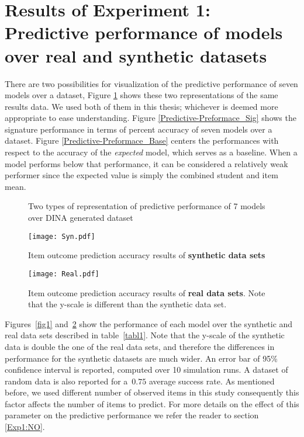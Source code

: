 \section{Results of Experiment 1: Predictive performance of models over real and synthetic datasets} \label{secSyn}

There are two possibilities for visualization of the predictive performance of seven models over a dataset, Figure \ref{Fig:Predictive-Preformace_rep} shows these two representations of the same results data. We used both of them in this thesis; whichever is deemed more appropriate to ease understanding. Figure \ref{Predictive-Preformace_Sig} shows the signature performance in terms of percent accuracy of seven models over a dataset. Figure \ref{Predictive-Preformace_Base} centers the performances with respect to the accuracy of the \textit{expected} model, which serves as a baseline. When a model performs below that performance, it can be considered a relatively weak performer since the expected value is simply the combined student and item mean.

\begin{figure}[h]
\centering
 \quad
{}
\caption{Two types of representation of predictive performance of 7 models over DINA generated dataset}
\label{Fig:Predictive-Preformace_rep}
\end{figure}


\begin{figure}
\centering
\texttt{[image: Syn.pdf]}
\caption{Item outcome prediction accuracy results of {\textbf{synthetic data sets}}}
\label{fig1}

{\texttt{[image: Real.pdf]}}
\caption{Item outcome prediction accuracy results of {\textbf{real data sets}}. Note that the y-scale is different than the synthetic data set.}
\label{fig2}
\end{figure}


Figures~\ref{fig1} and~\ref{fig2} show the performance of each model over the synthetic and real data sets described in table~\ref{tabl1}. Note that the y-scale of the synthetic data is double the one of the real data sets, and therefore the differences in performance for the synthetic datasets are much wider. An error bar of 95\% confidence interval is reported, computed over 10 simulation runs. A dataset of random data is also reported for a~$0.75$ average success rate. As mentioned before, we used different number of observed items in this study consequently this factor affects the number of items to predict. For more details on the effect of this parameter on the predictive performance we refer the reader to section \ref{Exp1:NO}.


